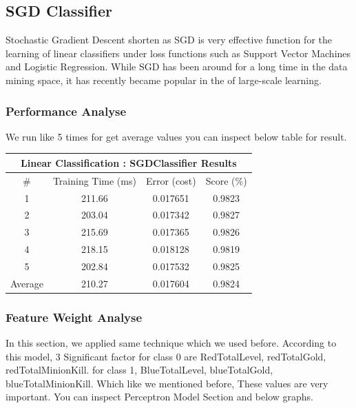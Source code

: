 \documentclass[a4paper]{article}
\begin{document}
\pagebreak

\subsection{SGD Classifier}

Stochastic Gradient Descent shorten as SGD is very effective function for the learning of linear classifiers under loss functions such as Support Vector Machines and Logistic Regression. While SGD has been around for a long time in the data mining space, it has recently became popular in the of large-scale learning.

\subsubsection{Performance Analyse}

We run like 5 times  for get average values you can inspect below table for result.

\begin{table}[H]
\centering
\begin{tabular}{|cccc|}
\hline
\multicolumn{4}{|c|}{\textbf{Linear Classification : SGDClassifier Results}} \\ \hline
\#           & Training Time (ms)      & Error (cost)      & Score (\%)      \\ \hline
1            & 211.66                  & 0.017651          & 0.9823          \\
2            & 203.04                  & 0.017342          & 0.9827          \\
3            & 215.69                  & 0.017365          & 0.9826          \\
4            & 218.15                  & 0.018128          & 0.9819          \\
5            & 202.84                  & 0.017532          & 0.9825          \\ \hline
Average      & 210.27                  & 0.017604          & 0.9824          \\ \hline
\end{tabular}
\end{table}

\subsubsection{Feature Weight Analyse}

In this section, we applied same technique which we used before. According to this model, 3 Significant factor for class 0 are RedTotalLevel, redTotalGold, redTotalMinionKill. for class 1, BlueTotalLevel, blueTotalGold, blueTotalMinionKill. Which like we mentioned before, These values are very important. You can inspect Perceptron Model Section and below graphs.
\end{document}
